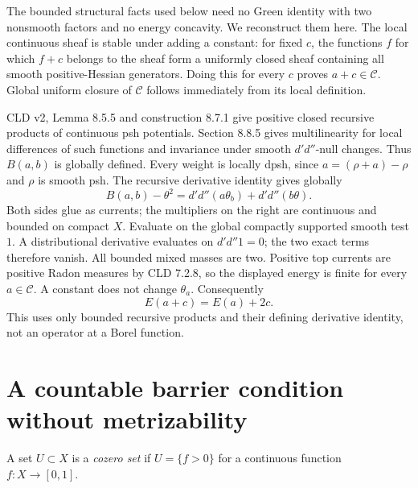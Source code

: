 \documentclass[11pt]{article}
\newcommand{\DD}{d'd''}
\newcommand{\C}{\mathcal C}
\begin{document}
The bounded structural facts used below need no Green identity with two
nonsmooth factors and no energy concavity. We reconstruct them here.
The local continuous sheaf is stable under adding a constant: for fixed
$c$, the functions $f$ for which $f+c$ belongs to the sheaf form a
uniformly closed sheaf containing all smooth positive-Hessian generators.
Doing this for every $c$ proves $a+c\in\C$. Global uniform closure of
$\C$ follows immediately from its local definition.

CLD v2, Lemma 8.5.5 and construction 8.7.1 give positive closed
recursive products of continuous psh potentials. Section 8.8.5 gives
multilinearity for local differences of such functions and invariance
under smooth $\DD$-null changes. Thus $B(a,b)$ is globally defined.
Every weight is locally dpsh, since $a=(\rho+a)-\rho$ and $\rho$ is
smooth psh. The recursive derivative identity gives globally
\[
 B(a,b)-\theta^2=\DD(a\theta_b)+\DD(b\theta).
\]
Both sides glue as currents; the multipliers on the right are continuous
and bounded on compact $X$. Evaluate on the global compactly supported
smooth test $1$. A distributional derivative evaluates on $\DD1=0$;
the two exact terms therefore vanish. All bounded mixed masses are two.
Positive top currents are positive Radon measures by CLD 7.2.8, so the
displayed energy is finite for every $a\in\C$. A constant does not
change $\theta_a$. Consequently
\begin{equation}\label{shift}
                 E(a+c)=E(a)+2c.
\end{equation}
This uses only bounded recursive products and their defining derivative
identity, not an operator at a Borel function.

\section*{A countable barrier condition without metrizability}
A set $U\subset X$ is a \emph{cozero set} if
$U=\{f>0\}$ for a continuous function $f:X\to[0,1]$.
\end{document}
